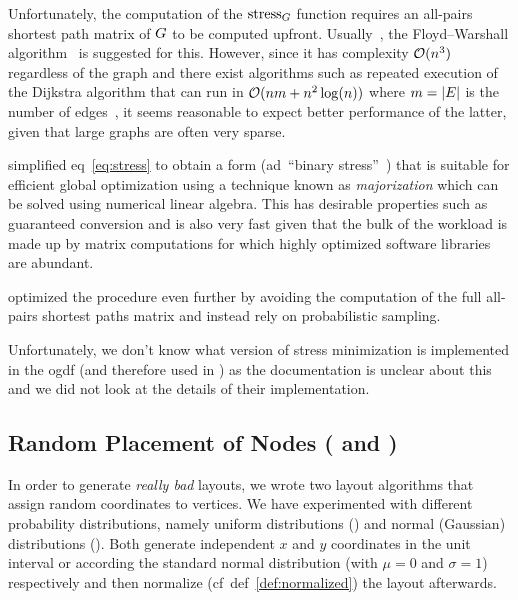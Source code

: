 \documentclass{graphstudy}
\begin{document}
Unfortunately, the computation of the \(\operatorname{stress}_G\) function requires an all-pairs shortest path matrix of
\(G\) to be computed upfront.  Usually~\cite{Kamada1989,Kobourov2013}, the Floyd--Warshall
algorithm~\cite{Floyd1962} is suggested for this.  However, since it has complexity \(\operatorname{\mathcal{O}}(n^3)\) regardless of the
graph and there exist algorithms such as repeated execution of the Dijkstra algorithm that can run in
\(\operatorname{\mathcal{O}}(nm+n^2\log(n))\) where \(m=\left\lvert E\right\rvert\) is the number of edges~\cite{Sanders2008}, it seems reasonable to expect
better performance of the latter, given that large graphs are often very sparse.

\textcite{Gansner2005} simplified \acl{eq}~\ref{eq:stress} to obtain a form (\ac{ad}~\enquote{binary
  stress}~\cite{Koren2008}) that is suitable for efficient global optimization using a technique known as
\emph{majorization} which can be solved using numerical linear algebra.  This has desirable properties such as
guaranteed conversion and is also very fast given that the bulk of the workload is made up by matrix computations for
which highly optimized software libraries are abundant.

\textcite{Brandes2007} optimized the procedure even further by avoiding the computation of the full all-pairs shortest
paths matrix and instead rely on probabilistic sampling.

Unfortunately, we don't know what version of stress minimization is implemented in the \ac{ogdf} (and therefore used in
) as the documentation is unclear about this and we did not look at the details of their implementation.

\subsection{Random Placement of Nodes ( and )}
\label{sec:random}

In order to generate \emph{really bad} layouts, we wrote two layout algorithms that assign random coordinates to
vertices.  We have experimented with different probability distributions, namely uniform distributions
() and normal (Gaussian) distributions ().  Both generate independent \(x\)
and \(y\) coordinates in the unit interval or according the standard normal distribution (with \(\mu=0\) and
\(\sigma=1\)) respectively and then normalize (\ac{cf}~\acs{def}~\ref{def:normalized}) the layout afterwards.
\end{document}
